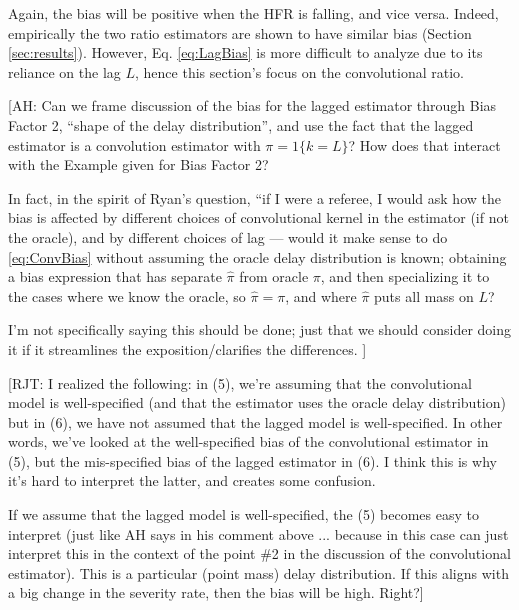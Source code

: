 \documentclass{article}
\newcommand{\ahcomment}[1]{{\color{red}[AH: #1]}}
\newcommand{\rjtcomment}[1]{{\color{purple}[RJT: #1]}}
\begin{document}
\noindent Again, the bias will be positive when the HFR is falling, and vice versa. Indeed, empirically the two ratio estimators are shown to have similar bias (Section \ref{sec:results}). However, Eq. \ref{eq:LagBias} is more difficult to analyze due to its reliance on the lag $L$, hence this section's focus on the convolutional ratio.

\ahcomment{
Can we frame discussion of the bias for the lagged
estimator through Bias Factor 2, 
``shape of the delay distribution'', and use
the fact that the lagged estimator is a
convolution estimator with
$\pi=1\{k=L\}$?  How does that interact with the
Example given for Bias Factor 2?

In fact, in the spirit of Ryan's question, 
``if I were a referee, I would ask how the bias
is affected by different choices of convolutional
kernel in the estimator (if not the oracle),
and by different choices of lag --- would it 
make sense to do \eqref{eq:ConvBias} without 
assuming the oracle delay distribution is known;
obtaining a bias expression that has
separate $\hat\pi$ from oracle $\pi$, and then
specializing it to the cases where we know
the oracle, so $\hat\pi=\pi$, and where
$\hat\pi$ puts all mass on $L$?

I'm not specifically saying this should be done;
just that we should consider doing it if it
streamlines the exposition/clarifies the differences.
}

\rjtcomment{I realized the following: in (5), we're assuming that the convolutional model is well-specified (and that the estimator uses the oracle delay distribution) but in (6), we have not assumed that the lagged model is well-specified. In other words, we've looked at the well-specified bias of the convolutional estimator in (5), but the mis-specified bias of the lagged estimator in (6). I think this is why it's hard to interpret the latter, and creates some confusion.

If we assume that the lagged model is well-specified, the (5) becomes easy to interpret (just like AH says in his comment above ... because in this case can just interpret this in the context of the point \#2 in the discussion of the convolutional estimator). This is a particular (point mass) delay distribution. If this aligns with a big change in the severity rate, then the bias will be high. Right?}

\end{document}
